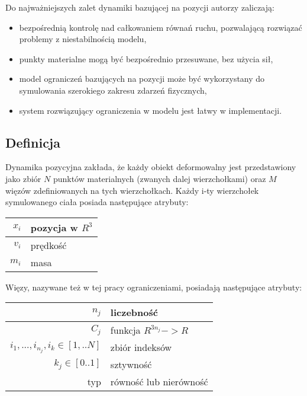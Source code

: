 Do najważniejszych zalet dynamiki bazującej na pozycji autorzy \cite{pbdyn}
zaliczają:
\begin{itemize}
	\item bezpośrednią kontrolę nad całkowaniem równań ruchu, pozwalającą
	rozwiązać problemy z niestabilnością modelu,
	\item punkty materialne mogą być bezpośrednio przesuwane, bez użycia sił,
	\item model ograniczeń bazujących na pozycji może być wykorzystany do
	symulowania szerokiego zakresu zdarzeń fizycznych,
	\item system rozwiązujący ograniczenia w modelu jest łatwy w implementacji.
\end{itemize}

\subsection{Definicja}
Dynamika pozycyjna zakłada, że każdy obiekt deformowalny jest przedstawiony jako zbiór $N$
punktów materialnych (zwanych dalej wierzchołkami) oraz $M$ więzów
zdefiniowanych na tych wierzchołkach. Każdy i-ty wierzchołek symulowanego ciała posiada
następujące atrybuty:

\vspace{0.5cm}
\centering
\begin{tabular}{|r|l|}
\hline
$x_i$ & pozycja w $R^3$ \\
\hline
$v_i$ & prędkość \\
\hline
$m_i$ & masa\\
\hline
\end{tabular}
\vspace{0.5cm}

\raggedright
Więzy, nazywane też w tej pracy ograniczeniami, posiadają następujące atrybuty:
\vspace{0.5cm}

\centering
\begin{tabular}{|r|l|}
\hline
$n_j$ & liczebność \\
\hline
$C_j$ & funkcja $R^{3n_j} -> R$\\
\hline
${i_1, ..., i_{n_j}}, i_k \in [1,..N]$ & zbiór indeksów\\
\hline
$k_j \in [0.. 1]$ & sztywność\\
\hline
typ & równość lub nierówność\\
\hline
\end{tabular}
\vspace{0.5cm}

